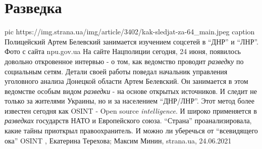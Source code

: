  
 
 
 
 
\chapter{Разведка}

\ifcmt
  pic https://img.strana.ua/img/article/3402/kak-sledjat-za-64_main.jpeg
	caption Полицейский Артем Белевский занимается изучением соцсетей в \enquote{ДНР} и \enquote{ЛНР}. Фото с сайта npu.gov.ua 
\fi
На сайте Нацполиции сегодня, 24 июня, появилось довольно откровенное интервью -
о том, как ведомство проводит \emph{разведку} по социальным сетям.  Детали своей
работы поведал начальник управления уголовного анализа Донецкой области Артем
Белевский.  Он занимается в этом ведомстве особым видом \emph{разведки} - на основе
открытых источников.  И следит не только за жителями Украины, но и за
населением \enquote{ДНР/ЛНР}.  Этот метод более известен сегодня как OSINT - Open
source \emph{intelligence}. И широко применяется в \emph{разведках} государств НАТО и
Европейского союза.  \enquote{Страна} проанализировала, какие тайны приоткрыл
правоохранитель. И можно ли уберечься от \enquote{всевидящего ока}  OSINT
, 
Екатерина Терехова; Максим Минин, strana.ua, 24.06.2021

